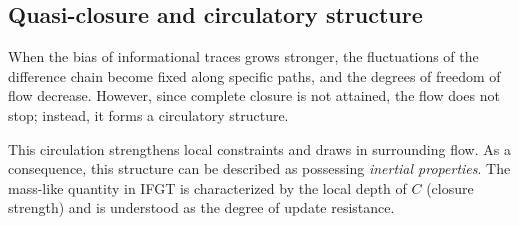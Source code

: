 \subsection{Quasi-closure and circulatory structure}
\label{subsec:circulatory_structure}

When the bias of informational traces grows stronger, the fluctuations of the difference chain become fixed along specific paths, and the degrees of freedom of flow decrease. However, since complete closure is not attained, the flow does not stop; instead, it forms a circulatory structure.

This circulation strengthens local constraints and draws in surrounding flow. As a consequence, this structure can be described as possessing \emph{inertial properties}. The mass-like quantity in IFGT is characterized by the local depth of $C$ (closure strength) and is understood as the degree of update resistance.
